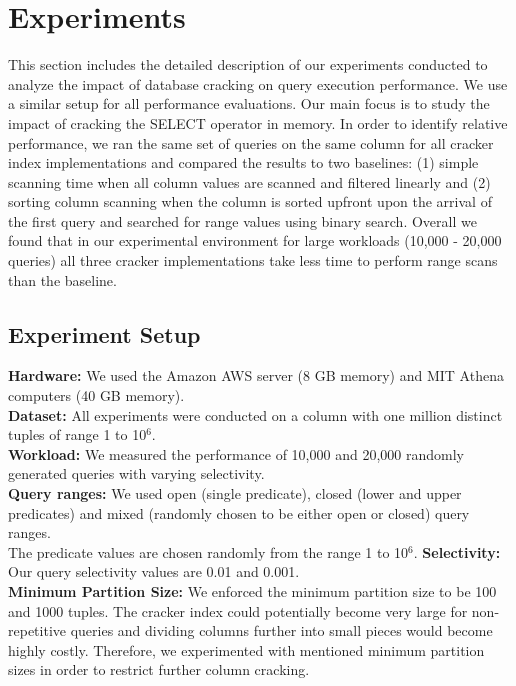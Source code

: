 \section{Experiments}
This section includes the detailed description of our experiments conducted to analyze the impact of database cracking on query execution performance. We use a similar setup for all performance evaluations. Our main focus is to study the impact of cracking the SELECT operator in memory. In order to identify relative performance, we ran the same set of queries on the same column for all cracker index implementations and compared the results to two baselines: (1) simple scanning time when all column values are scanned and filtered linearly and (2) sorting column scanning when the column is sorted upfront upon the arrival of the first query and searched for range values using binary search. Overall we found that in our experimental environment for large workloads (10,000 - 20,000 queries) all three cracker implementations take less time to perform range scans than the baseline.

\subsection{Experiment Setup}

\textbf{Hardware:} We used the Amazon AWS server (8 GB memory) and MIT Athena computers (40 GB memory). \\
\textbf{Dataset:} All experiments were conducted on a column with one million distinct tuples of range 1 to 10${^6}$. \\
\textbf{Workload:} We measured the performance of 10,000 and 20,000 randomly generated queries with varying selectivity.\\
\textbf{Query ranges:} We used open (single predicate), closed (lower and upper predicates) and mixed (randomly chosen to be either open or closed) query ranges.\\
The predicate values are chosen randomly from the range 1 to 10${^6}$.
\textbf{Selectivity:} Our query selectivity values are 0.01 and 0.001. \\
\textbf{Minimum Partition Size: } We enforced the minimum partition size to be 100 and 1000 tuples. The cracker index could potentially become very large for non-repetitive queries and dividing columns further into small pieces would become highly costly. Therefore, we experimented with mentioned minimum partition sizes in order to restrict further column cracking.

